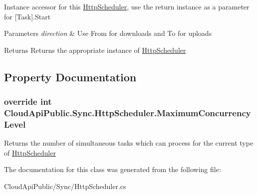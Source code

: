 Instance accessor for this \hyperlink{class_cloud_api_public_1_1_sync_1_1_http_scheduler}{Http\-Scheduler}, use the return instance as a parameter for \mbox{[}Task\mbox{]}.Start 


\begin{DoxyParams}{Parameters}
{\em direction} & Use From for downloads and To for uploads\\
\hline
\end{DoxyParams}
\begin{DoxyReturn}{Returns}
Returns the appropriate instance of \hyperlink{class_cloud_api_public_1_1_sync_1_1_http_scheduler}{Http\-Scheduler}
\end{DoxyReturn}


\subsection{Property Documentation}
\hypertarget{class_cloud_api_public_1_1_sync_1_1_http_scheduler_a2d4b8f13a92d4825cf12e9eb18578d95}{
\subsubsection[{Maximum\-Concurrency\-Level}]{\setlength{\rightskip}{0pt plus 5cm}override int Cloud\-Api\-Public.\-Sync.\-Http\-Scheduler.\-Maximum\-Concurrency\-Level\hspace{0.3cm}{\ttfamily [get]}}}\label{class_cloud_api_public_1_1_sync_1_1_http_scheduler_a2d4b8f13a92d4825cf12e9eb18578d95}


Returns the number of simultaneous tasks which can process for the current type of \hyperlink{class_cloud_api_public_1_1_sync_1_1_http_scheduler}{Http\-Scheduler} 



The documentation for this class was generated from the following file\-:\begin{DoxyCompactItemize}
\item 
Cloud\-Api\-Public/\-Sync/Http\-Scheduler.\-cs\end{DoxyCompactItemize}
